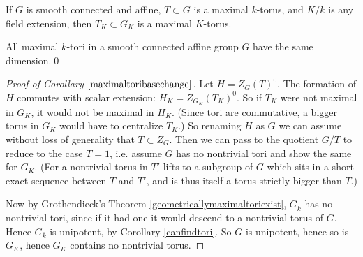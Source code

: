 \documentclass[10pt]{article}
\renewcommand{\(}{\left(}
\renewcommand{\)}{\right)}
\numberwithin{thm}{subsection}
\begin{document}
\begin{cor}\label{maximaltoribasechange}
If $G$ is smooth connected and affine, $T\subset G$ is a maximal $k$-torus,
and $K/k$ is any field extension,
then $T_K\subset G_K$ is a maximal $K$-torus.
\end{cor}
\begin{cor}\label{}
All maximal $k$-tori in a smooth connected affine group $G$
have the same dimension.\qed
\end{cor}
\begin{proof}[Proof of Corollary $\ref{maximaltoribasechange}$]
Let $H=Z_G(T)^0$.
The formation of $H$ commutes with scalar extension: $H_K=Z_{G_K}(T_K)^0$.
So if $T_K$ were not maximal in $G_K$, it would not be maximal in $H_K$.
(Since tori are commutative, a bigger torus in $G_K$ would have to centralize $T_K$.) 
So renaming $H$ as $G$ we can assume without loss of generality
that $T\subset Z_G$.
Then we can pass to the quotient $G/T$ to reduce to the case $T=1$,
i.e. assume $G$ has no nontrivial tori
and show the same for $G_K$.
(For a nontrivial torus in $T'$ lifts to a subgroup of $G$
which sits in a short exact sequence between $T$ and $T'$,
and is thus itself a torus strictly bigger than $T$.)

Now by Grothendieck's Theorem \ref{geometricallymaximaltoriexist},
$G_{\overline{k}}$ has no nontrivial tori,
since if it had one it would descend to a nontrivial torus of $G$.
Hence $G_{\overline{k}}$ is unipotent, by Corollary \ref{canfindtori}.
So $G$ is unipotent, hence so is $G_K$,
hence $G_K$ contains no nontrivial torus.
\end{proof}
\end{document}
